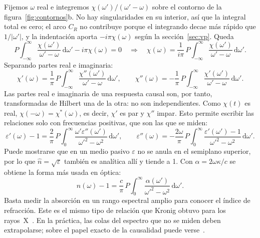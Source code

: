 \documentclass[11pt,letterpaper]{article}
\newcommand{\dd}{\mathrm{d}}
\newcommand{\nh}{\hat{n}}
\newcommand{\eps}{\varepsilon}
\newcommand{\vp}{P}   %
\begin{document}
Fijemos $\omega$ real e integremos $\chi(\omega')/(\omega'-\omega)$ sobre el
contorno de la figura~\ref{fig:contornos}b. No hay singularidades en su
interior, así que la integral total es cero; el arco $C_R$ no contribuye
porque el integrando decae más rápido que $1/|\omega'|$, y la indentación
aporta $-i\pi\chi(\omega)$ según la sección~\ref{sec:vp}. Queda
\begin{equation}\label{eq:kkcompleja}
  \vp\!\int_{-\infty}^{\infty}\frac{\chi(\omega')}{\omega'-\omega}\,\dd\omega'
  -i\pi\chi(\omega)=0
  \quad\Longrightarrow\quad
  \chi(\omega)=\frac{1}{i\pi}\,\vp\!\int_{-\infty}^{\infty}
  \frac{\chi(\omega')}{\omega'-\omega}\,\dd\omega'.
\end{equation}
Separando partes real e imaginaria:
\begin{equation}\label{eq:kk}
  \chi'(\omega)=\frac{1}{\pi}\,\vp\!\int_{-\infty}^{\infty}
  \frac{\chi''(\omega')}{\omega'-\omega}\,\dd\omega',\qquad
  \chi''(\omega)=-\frac{1}{\pi}\,\vp\!\int_{-\infty}^{\infty}
  \frac{\chi'(\omega')}{\omega'-\omega}\,\dd\omega'.
\end{equation}
Las partes real e imaginaria de una respuesta causal son, por tanto,
transformadas de Hilbert una de la otra: no son independientes. Como $\chi(t)$
es real, $\chi(-\omega)=\chi^*(\omega)$, es decir, $\chi'$ es par y $\chi''$
impar. Esto permite escribir las relaciones solo con frecuencias positivas, que
son las que se miden:
\begin{equation}\label{eq:kkpos}
  \eps'(\omega)-1=\frac{2}{\pi}\,\vp\!\int_0^\infty
  \frac{\omega'\eps''(\omega')}{\omega'^2-\omega^2}\,\dd\omega',\qquad
  \eps''(\omega)=-\frac{2\omega}{\pi}\,\vp\!\int_0^\infty
  \frac{\eps'(\omega')-1}{\omega'^2-\omega^2}\,\dd\omega'.
\end{equation}
Puede mostrarse que en un medio pasivo $\eps$ no se anula en el semiplano
superior, por lo que $\nh=\sqrt{\eps}$ también es analítica allí y tiende a 1.
Con $\alpha=2\omega\kappa/c$ se obtiene la forma más usada en óptica:
\begin{equation}\label{eq:kkn}
  n(\omega)-1=\frac{c}{\pi}\,\vp\!\int_0^\infty
  \frac{\alpha(\omega')}{\omega'^2-\omega^2}\,\dd\omega'.
\end{equation}
Basta medir la absorción en un rango espectral amplio para conocer el índice
de refracción. Este es el mismo tipo de relación que Kronig obtuvo para los
rayos~X~\cite{Kronig}. En la práctica, las colas del espectro que no se miden
deben extrapolarse; sobre el papel exacto de la causalidad puede
verse~\cite{Bechhoefer}.
\end{document}
